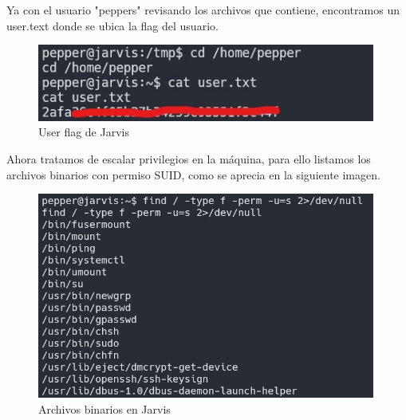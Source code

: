         \large{Ya con el usuario "peppers" revisando los archivos que contiene, encontramos un user.text donde se ubica la flag del usuario.}
        \par
        \begin{figure}[H]
            \centering
            \includegraphics[width=0.99\textwidth]{imagenes/jarvis/19_user_flag_jarvis.jpg}
            \caption{User flag de Jarvis}
        \end{figure}

        \large{Ahora tratamos de escalar privilegios en la máquina, para ello listamos los archivos binarios con permiso SUID, como se aprecia en la siguiente imagen.}
        \par
        \begin{figure}[H]
            \centering
            \includegraphics[width=0.99\textwidth]{imagenes/jarvis/20_binarios_suid_jarvis.png}
            \caption{Archivos binarios en Jarvis}
        \end{figure}

